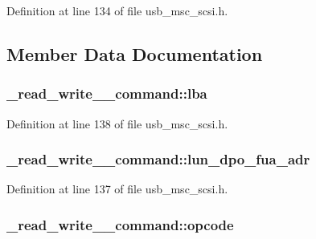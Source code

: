 Definition at line 134 of file usb\+\_\+msc\+\_\+scsi.\+h.



\subsection{Member Data Documentation}
\subsubsection[{\texorpdfstring{lba}{lba}}]{ \+\_\+read\+\_\+write\+\_\+\_\+command\+::lba}\hypertarget{struct__read__write__10__command_aa4c29706bfb663043403f8b28a1d32d1}{}\label{struct__read__write__10__command_aa4c29706bfb663043403f8b28a1d32d1}


Definition at line 138 of file usb\+\_\+msc\+\_\+scsi.\+h.

\subsubsection[{\texorpdfstring{lun\+\_\+dpo\+\_\+fua\+\_\+adr}{lun_dpo_fua_adr}}]{ \+\_\+read\+\_\+write\+\_\+\_\+command\+::lun\+\_\+dpo\+\_\+fua\+\_\+adr}\hypertarget{struct__read__write__10__command_abef755e80dc0f4bcad6559e56891bb33}{}\label{struct__read__write__10__command_abef755e80dc0f4bcad6559e56891bb33}


Definition at line 137 of file usb\+\_\+msc\+\_\+scsi.\+h.

\subsubsection[{\texorpdfstring{opcode}{opcode}}]{ \+\_\+read\+\_\+write\+\_\+\_\+command\+::opcode}\hypertarget{struct__read__write__10__command_aeb34b94d6270a9e710359de8cd2a0091}{}\label{struct__read__write__10__command_aeb34b94d6270a9e710359de8cd2a0091}


